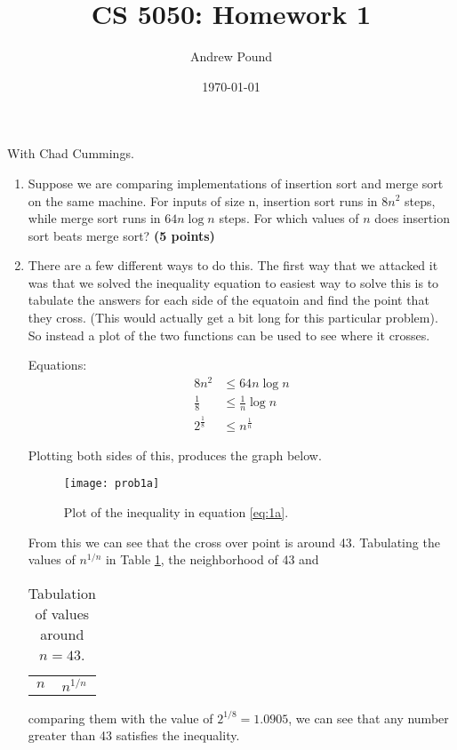 \documentclass{article}
\title{CS 5050: Homework 1}
\author{Andrew Pound}
\date{\today}
\begin{document}
\maketitle

\section{}
With Chad Cummings.
\begin{enumerate}[label=(\alph*)]
\item  Suppose we are comparing implementations of insertion sort and 
merge sort on the same machine. For inputs of size n, insertion sort
runs in $8n^2$ steps, while merge sort runs in $64n \log n$ steps. For
which values of $n$ does insertion sort beats merge sort? {\bf (5
  points)} 
\item[]
There are a few different ways to do this. The first way that we
attacked it was that we solved the inequality equation to easiest way
to solve this is to tabulate the answers for each side of the equatoin
and find the point that they cross.  (This would actually get a bit
long for this particular problem).  So instead a plot of the two
functions can be used to see where it crosses.

Equations:
\begin{equation}\label{eq:1a}
  \begin{split}
    8n^2 &\le 64n\log n\\
    \frac{1}{8} &\le  \frac{1}{n}\log n\\
    2^{\frac{1}{8}} &\le n^{\frac{1}{n}}
  \end{split}
\end{equation}

Plotting both sides of this, produces the graph below.
\begin{figure}[h!]
  \centering
  \texttt{[image: prob1a]}
  \caption{Plot of the inequality in equation \ref{eq:1a}.}
  \label{fig:prob1a}
\end{figure}

From this we can see that the cross over point is around 43.
Tabulating the values of $n^{1/n}$ in Table \ref{tab:1a}, the
neighborhood of 43 and 
\begin{table}[h!]
  \centering
  \caption{Tabulation of values around $n=43$.}
  \label{tab:1a}
  \begin{tabular}{cc}
    $n$ & $n^{1/n}$ \\
    
  \end{tabular}
\end{table}
comparing them with the value of $2^{1/8} = 1.0905$, we can see that
any number greater than 43 satisfies the inequality.  



\end{enumerate}
\end{document}
